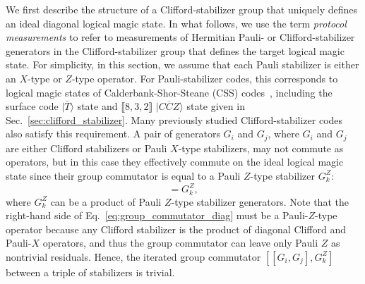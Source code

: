 \documentclass[
 reprint,
 amsmath,amssymb,
 pra,superscriptaddress, nofootinbib
]{revtex4-2}
\theoremstyle{definition}
\theoremstyle{plain}
\begin{document}
We first describe the structure of a Clifford-stabilizer group that uniquely defines an ideal diagonal logical magic state.
In what follows, we use the term \emph{protocol measurements} to refer to measurements of Hermitian Pauli- or Clifford-stabilizer generators in the Clifford-stabilizer group that defines the target logical magic state.
For simplicity, in this section, we assume that each Pauli stabilizer is either an $X$-type or $Z$-type operator. For Pauli-stabilizer codes, this corresponds to logical magic states of Calderbank-Shor-Steane (CSS) codes~\cite{PhysRevLett.77.793,PhysRevA.54.1098}, including the surface code $|\bar{T}\rangle$ state and $\llbracket 8,3,2 \rrbracket$ $|\overline{CCZ}\rangle$ state given in Sec.~\ref{sec:clifford_stabilizer}.
Many previously studied Clifford-stabilizer codes~\cite{vrty-qs5h} also satisfy this requirement.
A pair of generators $G_i$ and $G_j$, where $G_i$ and $G_j$ are either Clifford stabilizers or Pauli $X$-type stabilizers, may not commute as operators, but in this case they effectively commute on the ideal logical magic state since their group commutator is equal to a Pauli $Z$-type stabilizer $G_k^Z$:
\begin{equation}
    [G_i, G_j]=G_k^Z,
    \label{eq:group_commutator_diag}
\end{equation}
where $G_k^Z$ can be a product of Pauli $Z$-type stabilizer generators.
Note that the right-hand side of Eq.~\eqref{eq:group_commutator_diag} must be a Pauli-$Z$-type operator because any Clifford stabilizer is the product of diagonal Clifford and Pauli-$X$ operators, and thus the group commutator can leave only Pauli $Z$ as nontrivial residuals. Hence, the iterated group commutator $[[G_i,G_j],G_k^Z]$ between a triple of stabilizers is trivial. 
\end{document}
